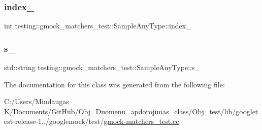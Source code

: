 \subsubsection{\texorpdfstring{index\_}{index\_}}
{\footnotesize\ttfamily int testing\+::gmock\+\_\+matchers\+\_\+test\+::\+Sample\+Any\+Type\+::index\+\_\+\hspace{0.3cm}{\ttfamily [private]}}

\mbox{\label{classtesting_1_1gmock__matchers__test_1_1_sample_any_type_a9efe8f287d4690eb126f1d8f399d227b}} 
\subsubsection{\texorpdfstring{s\_}{s\_}}
{\footnotesize\ttfamily std\+::string testing\+::gmock\+\_\+matchers\+\_\+test\+::\+Sample\+Any\+Type\+::s\+\_\+\hspace{0.3cm}{\ttfamily [private]}}



The documentation for this class was generated from the following file\+:\begin{DoxyCompactItemize}
\item 
C\+:/\+Users/\+Mindaugas K/\+Documents/\+Git\+Hub/\+Obj\+\_\+\+Duomenu\+\_\+apdorojimas\+\_\+class/\+Obj\+\_\+test/lib/googletest-\/release-\/1../googlemock/test/\mbox{\hyperlink{_obj__test_2lib_2googletest-release-1_88_81_2googlemock_2test_2gmock-matchers__test_8cc}{gmock-\/matchers\+\_\+test.\+cc}}\end{DoxyCompactItemize}
